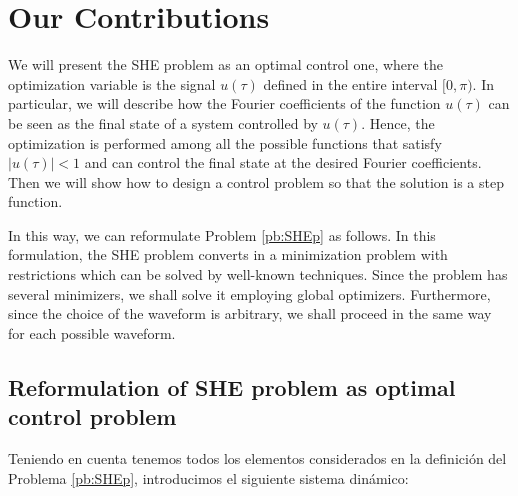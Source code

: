 \section{Our Contributions}

We will present the SHE problem as an optimal control one, where the optimization variable is the signal $u(\tau)$ defined in the entire interval $[0,\pi)$. 
%
In particular, we will describe how the Fourier coefficients of the function $u(\tau)$ can be seen as the final state of a system controlled by $u (\tau)$. Hence, the optimization is performed among all the possible functions that satisfy $|u(\tau)|<1 $ and can control the final state at the desired Fourier coefficients. Then we will show how to design a control problem so that the solution is a step function.
 
In this way, we can reformulate Problem \ref{pb:SHEp} as follows.
\newline
In this formulation, the SHE problem converts in a minimization problem with restrictions which can be solved by well-known techniques. Since the problem has several minimizers, we shall solve it employing global optimizers. Furthermore, since the choice of the waveform is arbitrary, we shall proceed in the same way for each possible waveform. 

\subsection{Reformulation of SHE problem as optimal control problem}


Teniendo en cuenta tenemos todos los elementos considerados en la definición del Problema \ref{pb:SHEp}, introducimos el siguiente sistema dinámico:

